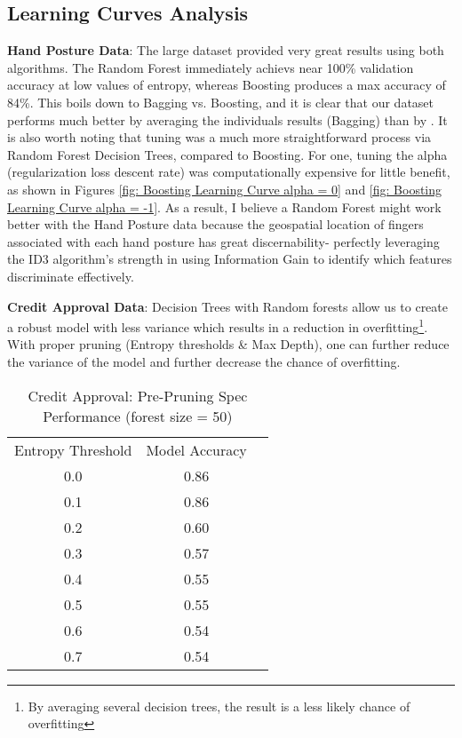 \documentclass[letterpaper,12pt]{article}
\begin{document}
\subsection{Learning Curves Analysis}

\textbf{Hand Posture Data}:  The large dataset provided very great results using both algorithms.  The Random Forest immediately achievs near 100\% validation accuracy at low values of entropy, whereas Boosting produces a max accuracy of 84\%.  This boils down to Bagging vs. Boosting, and it is clear that our dataset performs much better by averaging the individuals results (Bagging) than by .  It is also worth noting that tuning was a much more straightforward process via Random Forest Decision Trees, compared to Boosting.  For one, tuning the alpha (regularization loss descent rate) was computationally expensive for little benefit, as shown in Figures \ref{fig: Boosting Learning Curve alpha = 0} and \ref{fig: Boosting Learning Curve alpha = -1}.  As a result, I believe a Random Forest might work better with the Hand Posture data because the geospatial location of fingers associated with each hand posture has great discernability- perfectly leveraging the ID3 algorithm's strength in using Information Gain to identify which features discriminate effectively.  


\textbf{Credit Approval Data}: Decision Trees with Random forests allow us to create a robust model with less variance which results in a reduction in overfitting\footnote{By averaging several decision trees, the result is a less likely chance of overfitting}.  With proper pruning (Entropy thresholds \& Max Depth), one can further reduce the variance of the model and further decrease the chance of overfitting.


\begin{table}[htb]
  \caption{Credit Approval: Pre-Pruning Spec Performance (forest size = 50)}
  \label{table:PrePruningTable}
  \centering
  \begin{tabular}{|c|c|c|}
  
    \hline
    \hline
    \multicolumn{1}{c}{Entropy Threshold}
    &  \multicolumn{1}{c}{Model Accuracy} \\
    \cline{1-2}
    0.0 & 0.86 \\
    \cline{1-2}
    0.1 & 0.86 \\
    \cline{1-2}
    0.2 & 0.60 \\
    \cline{1-2}
    0.3 & 0.57 \\
    \cline{1-2}
    0.4 & 0.55 \\
    \cline{1-2}
    0.5 & 0.55 \\
    \cline{1-2}
    0.6 & 0.54 \\
    \cline{1-2}
    0.7 & 0.54 \\
    
    
    \cline{1-2}
  \end{tabular}
\end{table}
\end{document}
